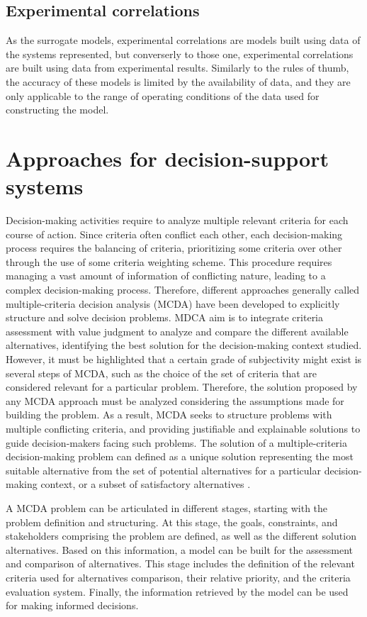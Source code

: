 \begin{refsection}[referencesCh1]
\subsection{Experimental correlations}
As the surrogate models, experimental correlations are models built using data of the systems represented, but converserly to those one, experimental correlations are built using data  from experimental results. Similarly to the rules of thumb, the accuracy of these models is limited by the availability of data, and they are only applicable to the range of operating conditions of the data used for constructing the model.

\section{Approaches for decision-support systems}
Decision-making activities require to analyze multiple relevant criteria for each course of action. Since criteria often conflict each other, each decision-making process requires the balancing of criteria, prioritizing some criteria over other through the use of some criteria weighting scheme. This procedure requires managing a vast amount of information of conflicting nature, leading to a complex decision-making process. Therefore, different approaches generally called multiple-criteria decision analysis (MCDA) have been developed to explicitly structure and solve decision problems. MDCA aim is to integrate criteria assessment with value judgment to analyze and compare the different available alternatives, identifying the best solution for the decision-making context studied. However, it must be highlighted that a certain grade of subjectivity might exist is several steps of MCDA, such as the choice of the set of criteria that are considered relevant for a particular problem. Therefore, the solution proposed by any MCDA approach must be analyzed considering the assumptions made for building the problem. As a result, MCDA seeks to structure problems with multiple conflicting criteria, and providing justifiable and explainable solutions to guide decision-makers facing such problems. The solution of a multiple-criteria decision-making problem can defined as a unique solution representing the most suitable alternative from the set of potential alternatives for a particular decision-making context, or a subset of satisfactory alternatives \citep{belton2002multiple}.

A MCDA problem can be articulated in different stages, starting with the problem definition and structuring. At this stage, the goals, constraints, and stakeholders comprising the problem are defined, as well as the different solution alternatives. Based on this information, a model can be built for the assessment and comparison of alternatives. This stage includes the definition of the relevant criteria used for alternatives comparison, their relative priority, and the criteria evaluation system. Finally, the information retrieved by the model can be used for making informed decisions.


\end{refsection}
